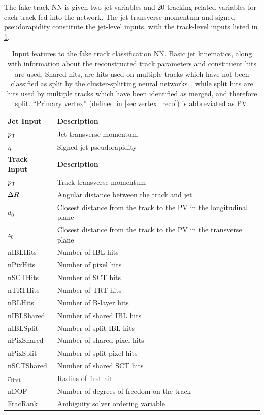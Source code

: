 The fake track NN is given two jet variables and 20 tracking related variables for each track fed into the network.
The jet transverse momentum and signed pseudorapidity constitute the jet-level inputs, with the track-level inputs listed in \cref{tab:fake_mva_track_inputs}.


\begin{table}[!htbp]
  \footnotesize\centering
  \setlength{\tabcolsep}{0.5em} %
  \begin{tabular}{ll}
    \toprule\hline
    \textbf{Jet Input} & \textbf{Description} \\
    \hline
    $p_{\text{T}}$ & Jet transverse momentum \\
    $\eta$ & Signed jet pseudorapidity \\
    \toprule
    \textbf{Track Input} & \textbf{Description} \\
    \hline
    $p_{\text{T}}$ & Track transverse momentum \\
    $\Delta R$ & Angular distance between the track and jet \\
    $d_0$  & Closest distance from the track to the PV in the longitudinal plane \\
    $z_0$  & Closest distance from the track to the PV in the transverse plane \\
    nIBLHits   & Number of IBL hits \\
    nPixHits   & Number of pixel hits \\
    nSCTHits   & Number of SCT hits \\
    nTRTHits   & Number of TRT hits \\
    nBLHits    & Number of B-layer hits \\
    nIBLShared & Number of shared IBL hits \\
    nIBLSplit  & Number of split IBL hits \\
    nPixShared & Number of shared pixel hits \\
    nPixSplit  & Number of split pixel hits \\
    nSCTShared & Number of shared SCT hits \\
    $r_{\textnormal{first}}$      & Radius of first hit \\
    nDOF   & Number of degrees of freedom on the track \\
    FracRank & Ambiguity solver ordering variable \\
    \hline\bottomrule
  \end{tabular}
  \caption{
    Input features to the fake track classification NN.
    Basic jet kinematics, along with information about the reconstructed track parameters and constituent hits are used.
    Shared hits, are hits used on multiple tracks which have not been classified as split by the cluster-splitting neural networks~\cite{PERF-2015-08}, while split hits are hits used by multiple tracks which have been identified as merged, and therefore split.
    ``Primary vertex'' (defined in \cref{sec:vertex_reco}) is abbreviated as PV.
  }
  \label{tab:fake_mva_track_inputs}
\end{table}

